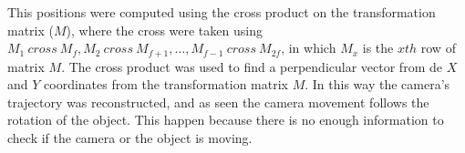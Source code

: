 \documentclass[12pt,a4paper]{article}
\begin{document}
This positions were computed using the cross product on the transformation matrix ($M$), where the cross were taken using $M_1 \ cross \ M_f, M_2 \ cross \ M_{f+1}, \dotso, M_{f-1} \ cross \ M_{2f}$, in which $M_x$ is the $xth$ row of matrix $M$. The cross product was used to find a perpendicular vector from de $X$ and $Y$ coordinates from the transformation matrix $M$. In this way the camera's trajectory was reconstructed, and as seen the camera movement follows the rotation of the object. This happen because there is no enough information to check if the camera or the object is moving. \\



 
\end{document}
